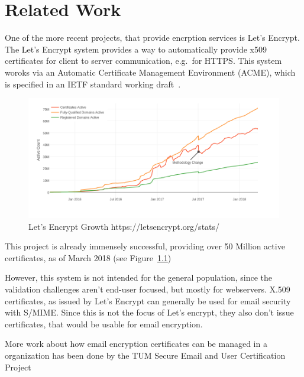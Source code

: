 \chapter{Related Work}\label{ch:relatedWork}
One of the more recent projects, that provide encrption services is Let's Encrypt.
The Let's Encrypt system provides a way to automatically provide x509 certificates for client to server communication,
e.g.\ for HTTPS\@.
This system woroks via an Automatic Certificate Management Environment (ACME), which is specified in an IETF standard
working draft~\cite{letsencrypteacme}.

\begin{figure}
    \centering
    \includegraphics[width=\textwidth]{figures/letsencryptusers.png}
    \caption{Let's Encrypt Growth https://letsencrypt.org/stats/}
    \label{fig:letsencrypt}
\end{figure}

This project is already immensely successful, providing over 50 Million active certificates, as of March 2018 (see
Figure~\ref{fig:letsencrypt})

However, this system is not intended for the general population, since the validation challenges aren't end-user
focused, but mostly for webservers.
X.509 certificates, as issued by Let's Encrypt can generally be used for email security with S/MIME.
Since this is not the focus of Let's encrypt, they also don't issue certificates, that would be usable for email
encryption.

More work about how email encryption certificates can be managed in a organization has been done by the TUM Secure
Email and User Certification Project~\cite{hauner2016interoperability, jagdish2016certservice, straub2016directoryservice, maier2015multidevice}

